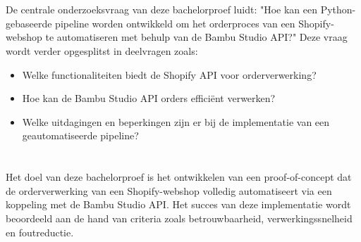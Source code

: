 
\section{}%
\label{sec:onderzoeksvraag}

De centrale onderzoeksvraag van deze bachelorproef luidt: "Hoe kan een Python-gebaseerde pipeline worden ontwikkeld om het orderproces van een Shopify-webshop te automatiseren met behulp van de Bambu Studio API?" Deze vraag wordt verder opgesplitst in deelvragen zoals:

\begin{itemize}
    \item Welke functionaliteiten biedt de Shopify API voor orderverwerking?
    \item Hoe kan de Bambu Studio API orders efficiënt verwerken?
    \item Welke uitdagingen en beperkingen zijn er bij de implementatie van een geautomatiseerde pipeline?
\end{itemize}


\section{}%
\label{sec:onderzoeksdoelstelling}

Het doel van deze bachelorproef is het ontwikkelen van een proof-of-concept dat de orderverwerking van een Shopify-webshop volledig automatiseert via een koppeling met de Bambu Studio API. Het succes van deze implementatie wordt beoordeeld aan de hand van criteria zoals betrouwbaarheid, verwerkingssnelheid en foutreductie.

